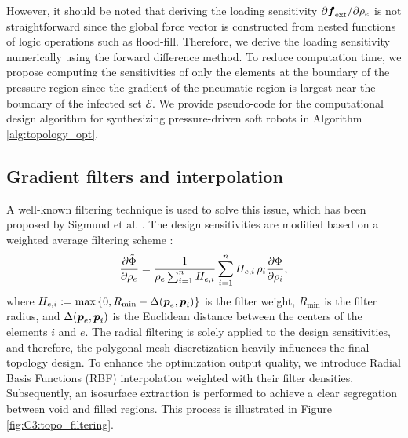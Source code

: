 \noindent However, it should be noted that deriving the loading sensitivity $\partial \boldsymbol{f}_{\textrm{ext}}/\partial \rho_e$ is not straightforward since the global force vector is constructed from nested functions of logic operations such as flood-fill. Therefore, we derive the loading sensitivity numerically using the forward difference method. To reduce computation time, we propose computing the sensitivities of only the elements at the boundary of the pressure region since the gradient of the pneumatic region is largest near the boundary of the infected set $\mathcal{E}$. We provide pseudo-code for the computational design algorithm for synthesizing pressure-driven soft robots in Algorithm \ref{alg:topology_opt}. 

\subsection{Gradient filters and interpolation}
A well-known filtering technique is used to solve this issue, which has been proposed by Sigmund et al. \cite{Bendsoe2003}. The design sensitivities are modified based on a weighted average filtering scheme \cite{Gain2013Dec,Bendsoe2003}:
%
\begin{equation}
\frac{\partial \tilde{\Phi}}{\partial {\rho_e}} = \frac{1}{\rho_e \sum^n_{i=1} H_{e,i}} \sum^n_{i=1} H_{e,i} \,\rho_i \frac{\partial {\Phi}}{\partial {\rho_i}},
\label{eq:C3:filters}
\end{equation}
%
where $H_{e,i} := \textrm{max} \left\{0, R_{\textrm{min}} - \Delta({\boldsymbol{p}}_e,{\boldsymbol{p}}_i)\right\}$ is the filter weight, $R_{\textrm{min}}$ is the filter radius, and $\Delta({\boldsymbol{p}}_e,{\boldsymbol{p}}_i)$ is the Euclidean distance between the centers of the elements $i$ and $e$. The radial filtering is solely applied to the design sensitivities, and therefore, the polygonal mesh discretization heavily influences the final topology design. To enhance the optimization output quality, we introduce Radial Basis Functions (RBF) interpolation weighted with their filter densities. Subsequently, an isosurface extraction is performed to achieve a clear segregation between void and filled regions. This process is illustrated in Figure \ref{fig:C3:topo_filtering}.

